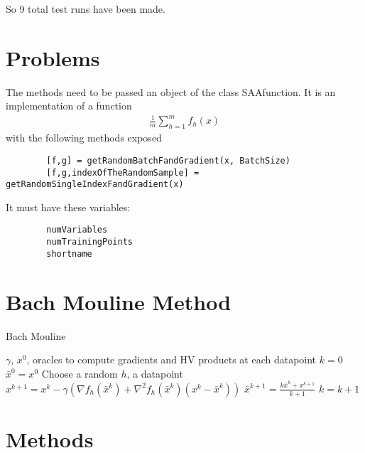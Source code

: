 \documentclass{article}
\begin{document}
So 9 total test runs have been made.


\section*{Problems}
The methods need to be passed an object of the class SAAfunction. It is an implementation of a function 
\begin{align*}
\frac{1}{m} \sum_{h=1}^m f_h(x)
\end{align*}
with the following methods exposed
\begin{verbatim}
        [f,g] = getRandomBatchFandGradient(x, BatchSize)
        [f,g,indexOfTheRandomSample] = getRandomSingleIndexFandGradient(x)
\end{verbatim}
It must have these variables:
\begin{verbatim}
        numVariables
        numTrainingPoints
        shortname
\end{verbatim}
\section*{Bach Mouline Method}

\begin{algorithm}[H]
\caption{Bach Mouline}
\label{alg1}
\begin{algorithmic}[1]
\REQUIRE  $\gamma$, $x^0$, oracles to compute gradients and HV products at each datapoint
\STATE  $k=0$
\STATE  $\bar{x}^0 = x^0$
\STATE Choose a random $h$, a datapoint
\STATE $x^{k+1} = x^k - \gamma (\nabla f_h(\bar{x}^k) + \nabla^2 f_h(\bar{x}^k) (x^k - \bar{x}^k))$
\STATE $\bar{x}^{k+1} = \frac{k\bar{x}^k +  x^{k+1}}{k+1}$
\STATE $k=k+1$
\ENDWHILE
\end{algorithmic}
\end{algorithm}

\section*{Methods}
\end{document}

